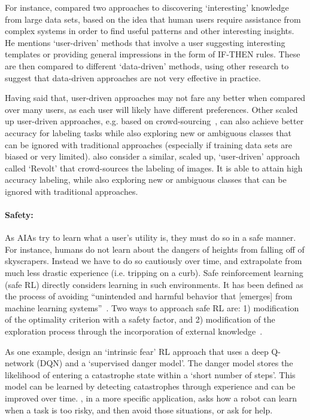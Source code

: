 For instance, \citet{Freitas2006-qo} compared two approaches to discovering `interesting' knowledge from large data sets, based on the idea that human users require assistance from complex systems in order to find useful patterns and other interesting insights. He mentions `user-driven' methods that involve a user suggesting interesting templates or providing general impressions in the form of IF-THEN rules. These are then compared to different `data-driven' methods, using other research to suggest that data-driven approaches are not very effective in practice.

Having said that, user-driven approaches may not fare any better when compared over many users, as each user will likely have different preferences. Other scaled up user-driven approaches, e.g. based on crowd-sourcing~\citet{Chang2017-kl}, can also achieve better accuracy for labeling tasks while also exploring new or ambiguous classes that can be ignored with traditional approaches (especially if training data sets are biased or very limited). \citet{Chang2017-kl} also consider a similar, scaled up, `user-driven' approach called `Revolt' that crowd-sources the labeling of images. It is able to attain high accuracy labeling, while also exploring new or ambiguous classes that can be ignored with traditional approaches.

\paragraph{Safety:}
As AIAs try to learn what a user's utility is, they must do so in a safe manner. For instance, humans do not learn about the dangers of heights from falling off of skyscrapers. Instead we have to do so cautiously over time, and extrapolate from much less drastic experience (i.e. tripping on a curb). Safe reinforcement learning (safe RL) directly considers learning in such environments. It has been defined as the process of avoiding ``unintended and harmful behavior that [emerges] from machine learning systems''~\cite{Amodei2016-xi}. Two ways to approach safe RL are: 1) modification of the optimality criterion with a safety factor, and 2) modification of the exploration process through the incorporation of external knowledge~\cite{Garcia2015-rs}.

As one example, \citet{Lipton2016-dq} design an `intrinsic fear' RL approach that uses a deep Q-network (DQN) and a `supervised danger model'. The danger model stores the likelihood of entering a catastrophe state within a `short number of steps'. This model can be learned by detecting catastrophes through experience and can be improved over time. \citet{Curran2016-ij}, in a more specific application, asks how a robot can learn when a task is too risky, and then avoid those situations, or ask for help.

